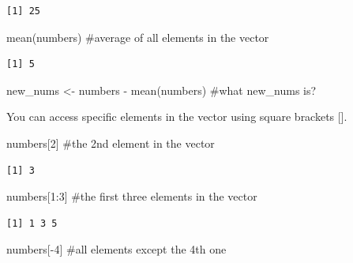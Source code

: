 \documentclass[
  letterpaper,
  DIV=11,
  numbers=noendperiod]{scrreprt}
\newenvironment{Shaded}{\begin{snugshade}}{\end{snugshade}}
\newcommand{\CommentTok}[1]{\textcolor[rgb]{0.37,0.37,0.37}{#1}}
\newcommand{\DecValTok}[1]{\textcolor[rgb]{0.68,0.00,0.00}{#1}}
\newcommand{\FunctionTok}[1]{\textcolor[rgb]{0.28,0.35,0.67}{#1}}
\newcommand{\NormalTok}[1]{\textcolor[rgb]{0.00,0.23,0.31}{#1}}
\newcommand{\OtherTok}[1]{\textcolor[rgb]{0.00,0.23,0.31}{#1}}
\newcommand{\SpecialCharTok}[1]{\textcolor[rgb]{0.37,0.37,0.37}{#1}}
\begin{document}
\begin{verbatim}
[1] 25
\end{verbatim}

\begin{Shaded}
\begin{Highlighting}[]
\FunctionTok{mean}\NormalTok{(numbers) }\CommentTok{\#average of all elements in the vector }
\end{Highlighting}
\end{Shaded}

\begin{verbatim}
[1] 5
\end{verbatim}

\begin{Shaded}
\begin{Highlighting}[]
\NormalTok{new\_nums }\OtherTok{\textless{}{-}}\NormalTok{ numbers }\SpecialCharTok{{-}} \FunctionTok{mean}\NormalTok{(numbers) }\CommentTok{\#what new\_nums is? }
\end{Highlighting}
\end{Shaded}

You can access specific elements in the vector using square brackets
{[}{]}.

\begin{Shaded}
\begin{Highlighting}[]
\NormalTok{numbers[}\DecValTok{2}\NormalTok{] }\CommentTok{\#the 2nd element in the vector }
\end{Highlighting}
\end{Shaded}

\begin{verbatim}
[1] 3
\end{verbatim}

\begin{Shaded}
\begin{Highlighting}[]
\NormalTok{numbers[}\DecValTok{1}\SpecialCharTok{:}\DecValTok{3}\NormalTok{] }\CommentTok{\#the first three elements in the vector }
\end{Highlighting}
\end{Shaded}

\begin{verbatim}
[1] 1 3 5
\end{verbatim}

\begin{Shaded}
\begin{Highlighting}[]
\NormalTok{numbers[}\SpecialCharTok{{-}}\DecValTok{4}\NormalTok{] }\CommentTok{\#all elements except the 4th one }
\end{Highlighting}
\end{Shaded}
\end{document}
